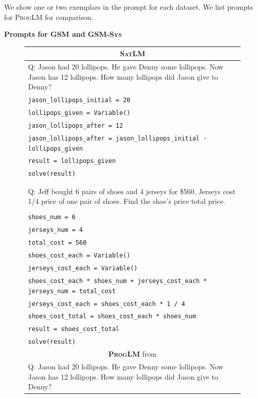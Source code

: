\documentclass{article}
\theoremstyle{definition}
\newcommand{\gsm}{\textsc{GSM}}
\newcommand{\gsmsys}{\textsc{GSM-Sys}}
\newcommand{\satlm}{\textsc{SatLM}}
\newcommand{\pallm}{\textsc{ProgLM}}
\begin{document}
We show one or two exemplars in the prompt for each dataset. We list prompts for \pallm{} for comparison.

\textbf{Prompts for \gsm{} and \gsmsys{}}


\begin{figure}[h]
    \footnotesize
    \centering
    \begin{tabularx}{\linewidth}{X}
    \toprule
            \multicolumn{1}{c}{\textbf{\satlm{}} } \\
         \midrule


Q: Jason had 20 lollipops. He gave Denny some lollipops. Now Jason has 12 lollipops. How many lollipops did Jason give to Denny?

\\
 \tt   jason\_lollipops\_initial = 20 \\
  \tt  lollipops\_given = Variable() \\
  \tt  jason\_lollipops\_after = 12 \\
  \tt  jason\_lollipops\_after = jason\_lollipops\_initial - lollipops\_given \\
 \tt   result = lollipops\_given\\
  \tt  solve(result) \\
\\
\\
Q: Jeff bought 6 pairs of shoes and 4 jerseys for \$560. Jerseys cost 1/4 price of one pair of shoes. Find the shoe's price total price.
\\
\\
  \tt  shoes\_num = 6 \\
 \tt   jerseys\_num = 4 \\
  \tt  total\_cost = 560 \\
  \tt  shoes\_cost\_each = Variable() \\
  \tt  jerseys\_cost\_each = Variable() \\
  \tt  shoes\_cost\_each * shoes\_num + jerseys\_cost\_each * jerseys\_num = total\_cost  \\
  \tt  jerseys\_cost\_each = shoes\_cost\_each * 1 / 4 \\
  \tt  shoes\_cost\_total = shoes\_cost\_each * shoes\_num \\
  \tt  result = shoes\_cost\_total \\
  \tt  solve(result) \\
    \midrule
       \multicolumn{1}{c}{{\bf \pallm{}} from \cite{pal} }   \\
   \midrule
Q: Jason had 20 lollipops. He gave Denny some lollipops. Now Jason has 12 lollipops. How many lollipops did Jason give to Denny? \\

\end{tabularx}
\end{figure}
\end{document}
